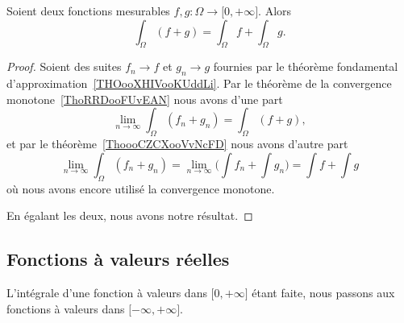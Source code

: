 \begin{proposition} \label{PROPooOVDEooDJvOau}
	Soient deux fonctions mesurables \( f,g\colon \Omega\to \mathopen[ 0 , +\infty \mathclose]\). Alors
	\begin{equation}
		\int_{\Omega}(f+g)=\int_{\Omega}f+\int_{\Omega}g.
	\end{equation}
\end{proposition}

\begin{proof}
	Soient des suites \( f_n\to f\) et \( g_n\to g\) fournies par le théorème fondamental d'approximation~\ref{THOooXHIVooKUddLi}. Par le théorème de la convergence monotone~\ref{ThoRRDooFUvEAN} nous avons d'une part
	\begin{equation}
		\lim_{n\to \infty} \int_{\Omega}(f_n+g_n)=\int_{\Omega}(f+g),
	\end{equation}
	et par le théorème~\ref{ThoooCZCXooVvNcFD} nous avons d'autre part
	\begin{equation}
		\lim_{n\to \infty} \int_{\Omega}(f_n+g_n)=\lim_{n\to \infty} \big( \int f_n+\int g_n \big)=\int f+\int g
	\end{equation}
	où nous avons encore utilisé la convergence monotone.

	En égalant les deux, nous avons notre résultat.
\end{proof}

\subsection{Fonctions à valeurs réelles}

L'intégrale d'une fonction à valeurs dans \( \mathopen[ 0 , +\infty \mathclose]\) étant faite, nous passons aux fonctions à valeurs dans \( \mathopen[ -\infty, +\infty \mathclose]\).

